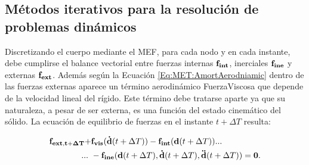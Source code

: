 \subsection{Métodos iterativos para la resolución de problemas dinámicos }\label{Sec:MET:EqEquilibrio}

%
%
%

Discretizando el cuerpo mediante el MEF, para cada nodo y en cada instante, debe cumplirse el balance vectorial entre fuerzas internas $\bf{f}_{int}$, inerciales $\bf{f}_{ine}$ y externas $\bf{f}_{ext}$. Además según la Ecuación \eqref{Eq:MET:AmortAerodniamic} dentro de las fuerzas externas aparece un término aerodinámico \gls{FuerzaViscosa} que depende de la velocidad lineal del rígido. Este término debe tratarse aparte ya que su naturaleza, a pesar de ser externa, es una función del estado cinemático del sólido. La ecuación de equilibrio de fuerzas en el instante $t+\Delta T$ resulta:

\begin{equation}\label{Eq:MET:EquilibrioExacto}
\begin{split}
	\bf{f}_{ext,t+\Delta T}+&\bf{f}_{vis}(\dot{\bf{d}}\text{$(t+\Delta T)$})-\bf{f}_{int}(\bf{d}\text{$(t+\Delta T)$})...\\
	...~&-\bf{f}_{ine}(\bf{d} \text{$(t+\Delta T)$},\dot{\bf{d}}\text{$(t+\Delta T)$},\ddot{\bf{d}}\text{$(t+\Delta T)$})=0.
\end{split}
\end{equation}


